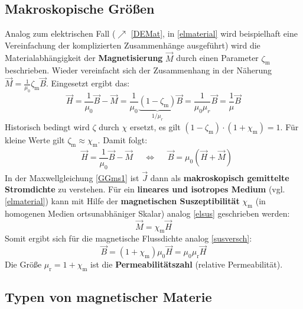 		  \subsection{Makroskopische Größen}
		  Analog zum elektrischen Fall ($\nearrow$ \ref{DEMat}, in \ref{elmaterial} wird beispielhaft eine Vereinfachung der komplizierten Zusammenhänge ausgeführt) wird die Materialabhängigkeit der \textbf{Magnetisierung} $\vec M$ durch einen Parameter $\zeta_\mathrm m$ beschrieben. Wieder vereinfacht sich der Zusammenhang in der Näherung $\vec M=\frac{1}{\mu_0}\zeta_\mathrm m\vec B$.
		  Eingesetzt ergibt das:
		  \begin{equation}\vec{H}=\frac{1}{\mu_0}\vec{B}-\vec{M}=\frac{1}{\mu_0}\underbrace{\left( 1-\zeta_{\mathrm m} \right)}_{1/\mu_r}\vec{B}=\frac{1}{\mu_0\mu_r}\vec{B}=\frac{1}{\mu}\vec{B}\end{equation}
		  Historisch bedingt wird $\zeta$ durch $\chi$ ersetzt, es gilt $(1-\zeta_\mathrm m)\cdot (1+\chi_\mathrm m)=1$. Für kleine Werte gilt $\zeta_\mathrm m \approx \chi_\mathrm m$. Damit folgt:
		        \begin{align}\label{matmagallg}
			         & \boxed{\vec{H}  = \dfrac{1}{\mu_0} \vec{B}  - \vec{M}}
			         &                                                        & \Leftrightarrow
			         &                                                        & \boxed{\vec{B}  = \mu_0  \left( \vec{H}  + \vec{M} \right)}
		        \end{align}
		  In der Maxwellgleichung \ref{GGms1} ist $\vec{J}$ dann als \textbf{makroskopisch gemittelte Stromdichte} zu verstehen. Für ein \textbf{lineares und isotropes Medium} (vgl. \ref{elmaterial}) kann mit Hilfe der \textbf{magnetischen Suszeptibilität} \(\chi_\mathrm{m} \) (in homogenen Medien ortsunabhäniger Skalar) analog \ref{elsus} geschrieben werden:
		  \begin{equation}
		  	{\vec{M} = \chi_\mathrm{m}  \vec{H} }
		  \end{equation}
		  Somit ergibt sich für die magnetische Flussdichte analog \ref{susversch}:
		        \begin{equation}\label{magsus}\boxed{\vec{B}  = \left( 1 + \chi_\mathrm{m} \right) \mu_0 \vec{H} = \mu_0 \mu_\mathrm{r} \vec{H}  }\end{equation}
Die Größe ${\mu_\mathrm{r} = 1 + \chi_\mathrm{m} }$ ist die \textbf{Permeabilitätszahl} (relative Permeabilität).
  \subsection{Typen von magnetischer Materie}
